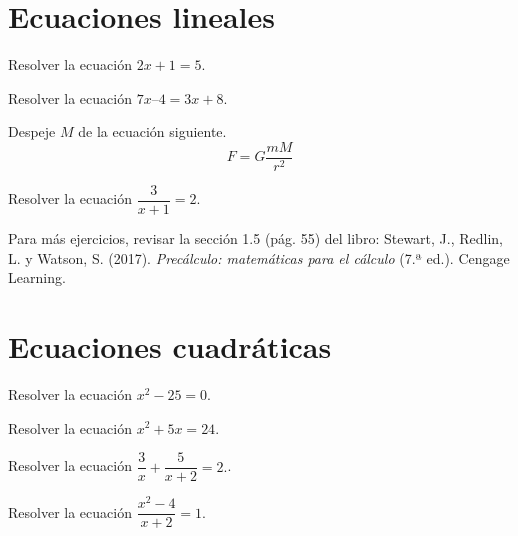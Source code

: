 \documentclass[a4,11pt]{aleph-notas}
\begin{document}
\encabezado

\section{Ecuaciones lineales}

\begin{ejer}
    Resolver la ecuación $2x+1=5$.
\end{ejer}

\begin{ejer}
    Resolver la ecuación $7x – 4 = 3x + 8$.
\end{ejer}

\begin{ejer}
    Despeje \(M\) de la ecuación siguiente.
    \[
        F = G \frac{mM}{r^2}
    \]
\end{ejer}

\begin{ejer}
    Resolver la ecuación $\dfrac{3}{x+1} = 2$.
\end{ejer}

\begin{advertencia}
    Para más ejercicios, revisar la sección 1.5 (pág. 55) del libro: Stewart, J., Redlin, L. y Watson, S. (2017). \textit{Precálculo: matemáticas para el cálculo} (7.ª ed.). Cengage Learning.
\end{advertencia}



\section{Ecuaciones cuadráticas}

\begin{ejer}
    Resolver la ecuación $x^2 - 25 = 0$.
\end{ejer}

\begin{ejer}
    Resolver la ecuación $x^2 + 5x = 24$.
\end{ejer}

\begin{ejer}
    Resolver la ecuación $\dfrac{3}{x} + \dfrac{5}{x+2} = 2.$.
\end{ejer}

\begin{ejer}
    Resolver la ecuación $\dfrac{x^2-4}{x+2} = 1$.
\end{ejer}
\end{document}
